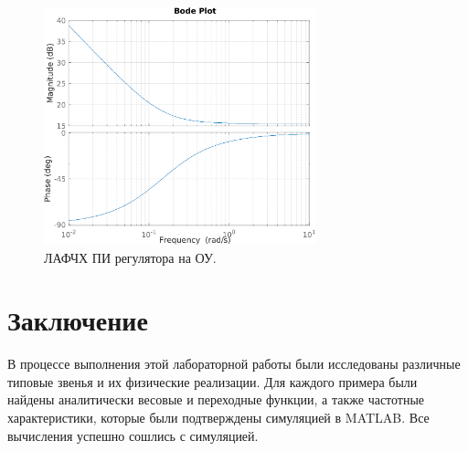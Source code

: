 \begin{figure}[H]
    \centering
    \includegraphics[width=0.7\textwidth]{figs/task_5_ЛАФЧХ.png}
    \caption{ЛАФЧХ ПИ регулятора на ОУ.}
    \label{fig:task_5_ЛАФЧХ}
\end{figure}


\section{Заключение}

В процессе выполнения этой лабораторной работы были исследованы различные
типовые звенья и их физические реализации. Для каждого примера были найдены
аналитически весовые и переходные функции, а также частотные характеристики,
которые были подтверждены симуляцией в MATLAB. Все вычисления успешно
сошлись с симуляцией.
